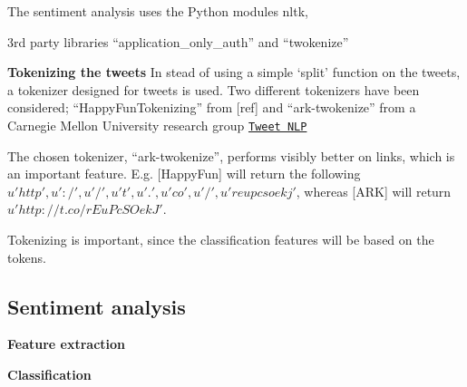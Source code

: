 \documentclass[Main]{subfiles}
\begin{document}



The sentiment analysis uses the Python modules nltk, 

3rd party libraries ``application\_only\_auth'' and ``twokenize''



\textbf{Tokenizing the tweets}
In stead of using a simple `split' function on the tweets, a tokenizer designed for tweets is used. Two different tokenizers have been considered; ``HappyFunTokenizing'' from [ref] and ``ark-twokenize'' from a Carnegie Mellon University research group \href{http://www.ark.cs.cmu.edu/TweetNLP/}{\tt Tweet NLP}

The chosen tokenizer, ``ark-twokenize'', performs visibly better on links, which is an important feature. E.g. [HappyFun] will return the following ${u'http', u':/', u'/', u't', u'.', u'co', u'/', u'reupcsoekj'}$, whereas [ARK] will return ${u'http://t.co/rEuPcSOekJ'}$. 

Tokenizing is important, since the classification features will be based on the tokens. 



\subsection{Sentiment analysis}

\textbf{Feature extraction}


\textbf{Classification}
\end{document}
